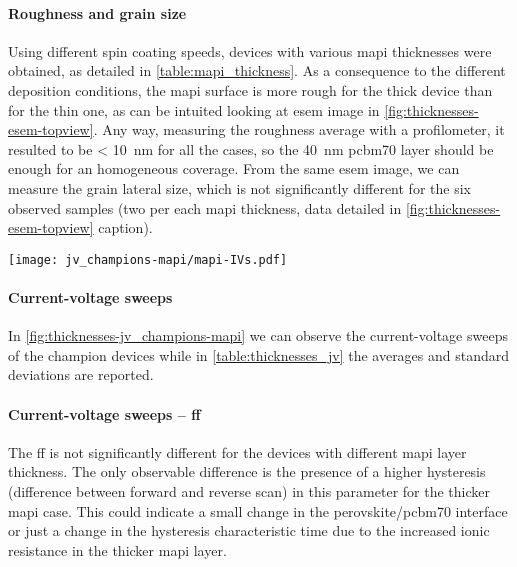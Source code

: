 \paragraph{Roughness and grain size}
Using different spin coating speeds, devices with various \gls{mapi} thicknesses were obtained, as detailed in \cref{table:mapi_thickness}.
As a consequence to the different deposition conditions, the \gls{mapi} surface is more rough for the thick device than for the thin one, as can be intuited looking at \gls{esem} image in \cref{fig:thicknesses-esem-topview}.
Any way, measuring the roughness average with a profilometer, it resulted to be \SI{< 10}{\nm} for all the cases, so the \SI{40}{\nm} \gls{pcbm70} layer should be enough for an homogeneous coverage.
From the same \gls{esem} image, we can measure the grain lateral size, which is not significantly different for the six observed samples (two per each \gls{mapi} thickness, data detailed in \cref{fig:thicknesses-esem-topview} caption).

\begin{SCfigure}
	\centering
	\texttt{[image: jv\_champions-mapi/mapi-IVs.pdf]}
	\label{fig:thicknesses-jv_champions-mapi}
\end{SCfigure}

\paragraph{Current-voltage sweeps}
In \cref{fig:thicknesses-jv_champions-mapi} we can observe the current-voltage sweeps of the champion devices while in \cref{table:thicknesses_jv} the averages and standard deviations are reported.

\paragraph{Current-voltage sweeps -- \gls{ff}}
The \gls{ff} is not significantly different for the devices with different \gls{mapi} layer thickness.
The only observable difference is the presence of a higher hysteresis (difference between forward and reverse scan) in this parameter for the thicker \gls{mapi} case.
This could indicate a small change in the perovskite\-/\gls{pcbm70} interface or just a change in the hysteresis characteristic time due to the increased ionic resistance in the thicker \gls{mapi} layer. 

